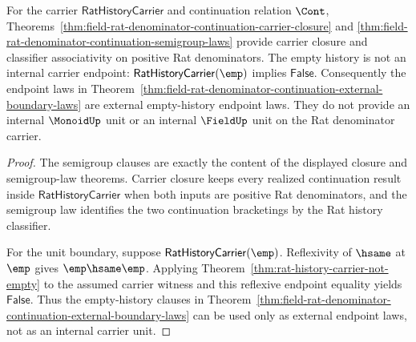 \begin{theorem}
\label{thm:field-rat-denominator-continuation-semigroup-only}
For the carrier $\mathsf{RatHistoryCarrier}$ and continuation relation $\Cont$,
Theorems~\ref{thm:field-rat-denominator-continuation-carrier-closure} and
\ref{thm:field-rat-denominator-continuation-semigroup-laws} provide carrier
closure and classifier associativity on positive Rat denominators. The empty
history is not an internal carrier endpoint: $\mathsf{RatHistoryCarrier}(\emp)$
implies $\mathsf{False}$. Consequently the endpoint laws in
Theorem~\ref{thm:field-rat-denominator-continuation-external-boundary-laws}
are external empty-history endpoint laws. They do not provide an internal
$\MonoidUp$ unit or an internal $\FieldUp$ unit on the Rat denominator carrier.
\end{theorem}
\begin{proof}
The semigroup clauses are exactly the content of the displayed closure and
semigroup-law theorems. Carrier closure keeps every realized continuation result
inside $\mathsf{RatHistoryCarrier}$ when both inputs are positive Rat
denominators, and the semigroup law identifies the two continuation bracketings
by the Rat history classifier.

For the unit boundary, suppose $\mathsf{RatHistoryCarrier}(\emp)$. Reflexivity
of $\hsame$ at $\emp$ gives $\emp\hsame\emp$. Applying
Theorem~\ref{thm:rat-history-carrier-not-empty} to the assumed carrier witness
and this reflexive endpoint equality yields $\mathsf{False}$. Thus the
empty-history clauses in
Theorem~\ref{thm:field-rat-denominator-continuation-external-boundary-laws}
can be used only as external endpoint laws, not as an internal carrier unit.
\end{proof}

